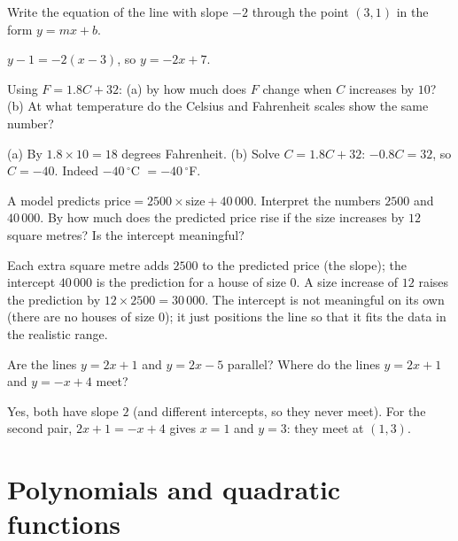 \begin{exercise}
Write the equation of the line with slope $-2$ through the point $(3, 1)$ in
the form $y = mx + b$.
\end{exercise}
\begin{solution}
$y - 1 = -2(x - 3)$, so $y = -2x + 7$.
\end{solution}

\begin{exercise}
Using $F = 1.8C + 32$: (a) by how much does $F$ change when $C$ increases by
$10$? (b) At what temperature do the Celsius and Fahrenheit scales show the
same number?
\end{exercise}
\begin{solution}
(a) By $1.8 \times 10 = 18$ degrees Fahrenheit. (b) Solve $C = 1.8C + 32$:
$-0.8C = 32$, so $C = -40$. Indeed $-40\,^\circ$C $= -40\,^\circ$F.
\end{solution}

\begin{exercise}
A model predicts $\text{price} = 2500 \times \text{size} + 40\,000$. Interpret
the numbers $2500$ and $40\,000$. By how much does the predicted price rise if
the size increases by $12$ square metres? Is the intercept meaningful?
\end{exercise}
\begin{solution}
Each extra square metre adds $2500$ to the predicted price (the slope); the
intercept $40\,000$ is the prediction for a house of size $0$. A size increase
of $12$ raises the prediction by $12 \times 2500 = 30\,000$. The intercept is
not meaningful on its own (there are no houses of size $0$); it just positions
the line so that it fits the data in the realistic range.
\end{solution}

\begin{exercise}
Are the lines $y = 2x + 1$ and $y = 2x - 5$ parallel? Where do the lines
$y = 2x + 1$ and $y = -x + 4$ meet?
\end{exercise}
\begin{solution}
Yes, both have slope $2$ (and different intercepts, so they never meet). For
the second pair, $2x + 1 = -x + 4$ gives $x = 1$ and $y = 3$: they meet at
$(1, 3)$.
\end{solution}

\section{Polynomials and quadratic functions}\label{sec:polynomials}

